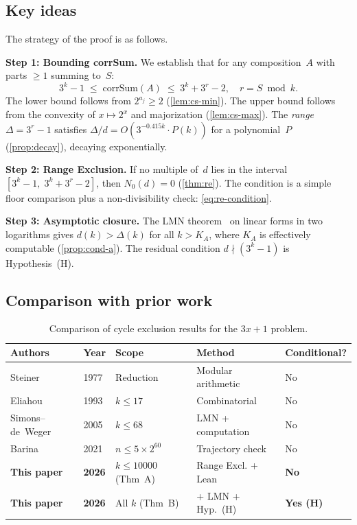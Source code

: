 \documentclass[11pt, a4paper]{amsart}
\theoremstyle{plain}
\theoremstyle{definition}
\theoremstyle{remark}
\newcommand{\corrSum}{\mathrm{corrSum}}
\begin{document}
\subsection{Key ideas}\label{ssec:key-ideas}

The strategy of the proof is as follows.

\textbf{Step 1: Bounding corrSum.}
We establish that for any composition~$A$ with parts $\geq 1$
summing to~$S$:
\begin{equation}\label{eq:bounds}
  3^k - 1 \;\leq\; \corrSum(A) \;\leq\; 3^k + 3^r - 2,
  \quad r = S \bmod k.
\end{equation}
The lower bound follows from $2^{a_j} \geq 2$ (\cref{lem:cs-min}).
The upper bound follows from the convexity of $x \mapsto 2^x$
and majorization (\cref{lem:cs-max}).
The \emph{range} $\Delta = 3^r - 1$ satisfies
$\Delta/d = O(3^{-0.415k} \cdot P(k))$
for a polynomial~$P$ (\cref{prop:decay}), decaying exponentially.

\textbf{Step 2: Range Exclusion.}
If no multiple of~$d$ lies in the interval
$[3^k - 1, \; 3^k + 3^r - 2]$, then $N_0(d) = 0$
(\cref{thm:re}).  The condition is a simple floor comparison
plus a non-divisibility check: \eqref{eq:re-condition}.

\textbf{Step 3: Asymptotic closure.}
The LMN theorem~\cite{LMN1995} on linear forms in two logarithms
gives $d(k) > \Delta(k)$ for all $k > K_A$, where $K_A$ is
effectively computable (\cref{prop:cond-a}).
The residual condition $d \nmid (3^k - 1)$ is
Hypothesis~(H).

\subsection{Comparison with prior work}\label{ssec:comparison}

\begin{table}[ht]
\centering
\caption{Comparison of cycle exclusion results for the $3x{+}1$ problem.}
\label{tab:comparison}
\begin{tabular}{lllll}
\toprule
Authors & Year & Scope & Method & Conditional? \\
\midrule
Steiner & 1977 & Reduction & Modular arithmetic & No \\
Eliahou & 1993 & $k \leq 17$ & Combinatorial & No \\
Simons--de~Weger & 2005 & $k \leq 68$ & LMN + computation & No \\
Barina & 2021 & $n \leq 5 \times 2^{60}$ & Trajectory check & No \\
\textbf{This paper} & \textbf{2026} & $k \leq 10000$ (Thm~A) & Range Excl. + Lean & \textbf{No} \\
\textbf{This paper} & \textbf{2026} & All $k$ (Thm~B) & + LMN + Hyp.~(H) & \textbf{Yes (H)} \\
\bottomrule
\end{tabular}
\end{table}
\end{document}
